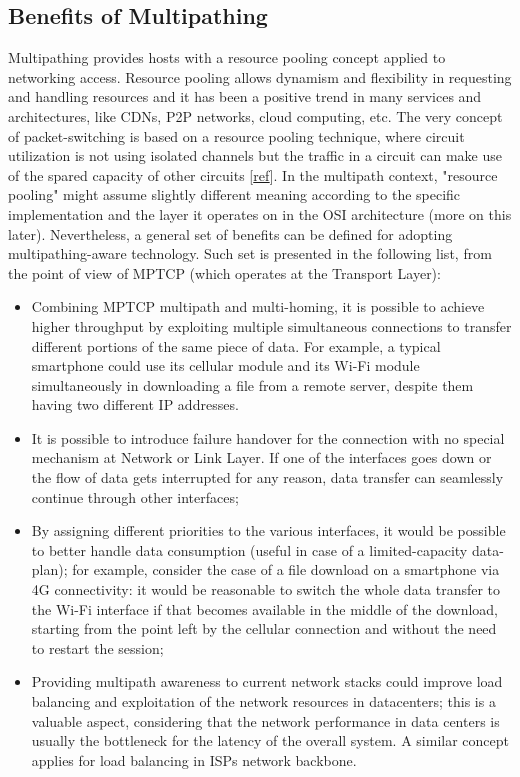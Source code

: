 \subsection{Benefits of Multipathing}
Multipathing provides hosts with a resource pooling concept applied to networking access. Resource pooling allows dynamism and flexibility in requesting and handling resources and it has been a positive trend in many services and architectures, like CDNs, P2P networks, cloud computing, etc. The very concept of packet-switching is based on a resource pooling technique, where circuit utilization is not using isolated channels but the traffic in a circuit can make use of the spared capacity of other circuits [\href{https://www.cl.cam.ac.uk/~as2330/docs/multipath-survey.pdf}{ref}].
In the multipath context, "resource pooling" might assume slightly different meaning according to the specific implementation and the layer it operates on in the OSI architecture (more on this later). Nevertheless, a general set of benefits can be defined for adopting multipathing-aware technology. Such set is presented in the following list, from the point of view of MPTCP (which operates at the Transport Layer):
\begin{itemize}
  \item Combining MPTCP multipath and multi-homing, it is possible to achieve higher throughput by exploiting multiple simultaneous connections to transfer different portions of the same piece of data. For example, a typical smartphone could use its cellular module and its Wi-Fi module simultaneously in downloading a file from a remote server, despite them having two different IP addresses.
  \item It is possible to introduce failure handover for the connection with no special mechanism at Network or Link Layer. If one of the interfaces goes down or the flow of data gets interrupted for any reason, data transfer can seamlessly continue through other interfaces;
  \item By assigning different priorities to the various interfaces, it would be possible to better handle data consumption (useful in case of a limited-capacity data-plan); for example, consider the case of a file download on a smartphone via 4G connectivity: it would be reasonable to switch the whole data transfer to the Wi-Fi interface if that becomes available in the middle of the download, starting from the point left by the cellular connection and without the need to restart the session;
  \item Providing multipath awareness to current network stacks could improve load balancing and exploitation of the network resources in datacenters; this is a valuable aspect, considering that the network performance in data centers is usually the bottleneck for the latency of the overall system. A similar concept applies for load balancing in ISPs network backbone.
\end{itemize}

